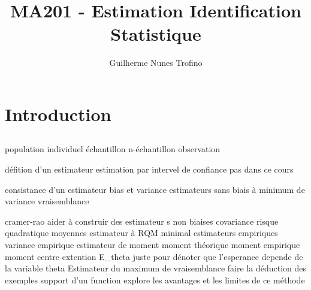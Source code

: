 \documentclass{article}
\title{MA201 - Estimation Identification Statistique}
\author{Guilherme Nunes Trofino}
\begin{document}
\maketitle

\newpage\tableofcontents

\section{Introduction}
\subsection{}
population
individuel
échantillon
n-échantillon
observation

défition d'un estimateur
estimation par intervel de confiance pas dans ce cours

consistance d'un estimateur
bias et variance
estimateurs sans biais à minimum de variance
vraisemblance

cramer-rao
aider à construir des estimateur s non biaises
covariance
risque quadratique moyennes
estimateur à RQM minimal
estimateurs empiriques
variance empirique
estimateur de moment
moment théorique
moment empirique
moment centre
extention
E_theta juste pour dénoter que l'esperance depende de la variable theta
Estimateur du maximum de vraisemblance
faire la déduction des exemples
support d'un function
explore les avantages et les limites de ce méthode

\end{document}
